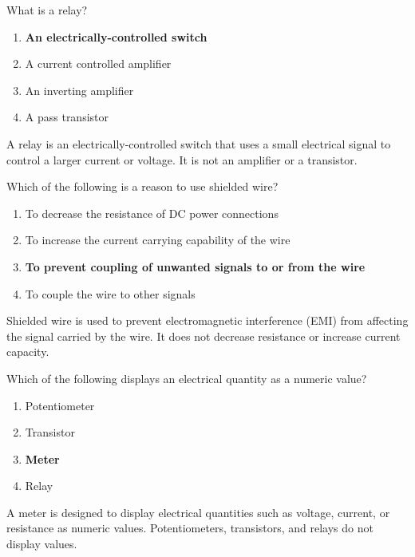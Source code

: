 
\begin{tcolorbox}[colback=gray!10!white,colframe=black!75!black,title={T6D02}]
    What is a relay?
    \begin{enumerate}[label=\Alph*),noitemsep]
        \item \textbf{An electrically-controlled switch}
        \item A current controlled amplifier
        \item An inverting amplifier
        \item A pass transistor
    \end{enumerate}
\end{tcolorbox}
A relay is an electrically-controlled switch that uses a small electrical signal to control a larger current or voltage. It is not an amplifier or a transistor.


\begin{tcolorbox}[colback=gray!10!white,colframe=black!75!black,title={T6D03}]
    Which of the following is a reason to use shielded wire?
    \begin{enumerate}[label=\Alph*),noitemsep]
        \item To decrease the resistance of DC power connections
        \item To increase the current carrying capability of the wire
        \item \textbf{To prevent coupling of unwanted signals to or from the wire}
        \item To couple the wire to other signals
    \end{enumerate}
\end{tcolorbox}
Shielded wire is used to prevent electromagnetic interference (EMI) from affecting the signal carried by the wire. It does not decrease resistance or increase current capacity.


\begin{tcolorbox}[colback=gray!10!white,colframe=black!75!black,title={T6D04}]
    Which of the following displays an electrical quantity as a numeric value?
    \begin{enumerate}[label=\Alph*),noitemsep]
        \item Potentiometer
        \item Transistor
        \item \textbf{Meter}
        \item Relay
    \end{enumerate}
\end{tcolorbox}
A meter is designed to display electrical quantities such as voltage, current, or resistance as numeric values. Potentiometers, transistors, and relays do not display values.

